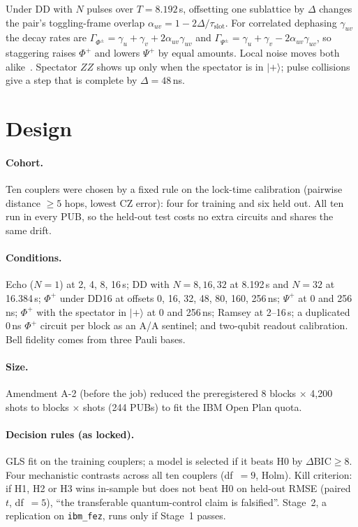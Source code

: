 \documentclass[10pt,twocolumn]{article}
\begin{document}
Under DD with $N$ pulses over $T=8.192$\,\textmu s, offsetting one sublattice by $\Delta$ changes
the pair's toggling-frame overlap $\alpha_{uv}=1-2\Delta/\tau_{\mathrm{slot}}$. For correlated
dephasing $\gamma_{uv}$ the decay rates are
$\Gamma_{\Phi^\pm}=\gamma_u+\gamma_v+2\alpha_{uv}\gamma_{uv}$ and
$\Gamma_{\Psi^\pm}=\gamma_u+\gamma_v-2\alpha_{uv}\gamma_{uv}$, so staggering raises $\Phi^+$ and lowers
$\Psi^+$ by equal amounts. Local noise moves both alike~\cite{tripathi,pazsilva,sung}. Spectator $ZZ$ shows up only when the
spectator is in $|{+}\rangle$; pulse collisions give a step that is complete by $\Delta=48$\,ns.

\section{Design}
\paragraph{Cohort.} Ten couplers were chosen by a fixed rule on the lock-time calibration
(pairwise distance $\ge5$ hops, lowest CZ error): four for training and six held out. All ten run in
every PUB, so the held-out test costs no extra circuits and shares the same drift.

\paragraph{Conditions.} Echo ($N=1$) at 2, 4, 8, 16\,\textmu s; DD with $N=8,16,32$ at 8.192\,\textmu s
and $N=32$ at 16.384\,\textmu s; $\Phi^+$ under DD16 at offsets 0, 16, 32, 48, 80, 160, 256\,ns;
$\Psi^+$ at 0 and 256\,ns; $\Phi^+$ with the spectator in $|{+}\rangle$ at 0 and 256\,ns; Ramsey at 2--16\,\textmu s;
a duplicated 0\,ns $\Phi^+$ circuit per block as an A/A sentinel; and two-qubit readout calibration.
Bell fidelity comes from three Pauli bases.

\paragraph{Size.} Amendment A-2 (before the job) reduced the preregistered 8 blocks $\times$ 4{,}200
shots to \Blocks{} blocks $\times$ \Shots{} shots (244 PUBs) to fit the IBM Open Plan quota.

\paragraph{Decision rules (as locked).} GLS fit on the training couplers; a model is selected if it
beats H0 by $\Delta\mathrm{BIC}\ge8$. Four mechanistic contrasts across all ten couplers (df~$=9$,
Holm). Kill criterion: if H1, H2 or H3 wins in-sample but does not beat H0 on held-out RMSE
(paired $t$, df~$=5$), ``the transferable quantum-control claim is falsified''. Stage~2, a replication
on \texttt{ibm\_fez}, runs only if Stage~1 passes.
\end{document}
